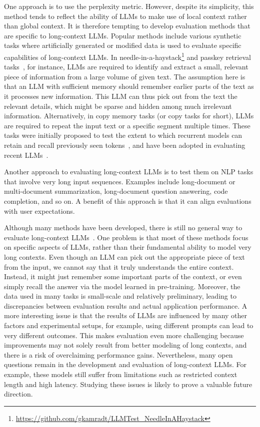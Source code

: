 One approach is to use the perplexity metric. However, despite its simplicity, this method tends to reflect the ability of LLMs to make use of local context rather than global context. It is therefore tempting to develop evaluation methods that are specific to long-context LLMs. Popular methods include various synthetic tasks where artificially generated or modified data is used to evaluate specific capabilities of long-context LLMs. In needle-in-a-haystack\footnote{\url{https://github.com/gkamradt/LLMTest_NeedleInAHaystack}} and passkey retrieval tasks~\cite{mohtashami-and-jaggi:2024random,chen-etal:2023extending}, for instance, LLMs are required to identify and extract a small, relevant piece of information from a large volume of given text. The assumption here is that an LLM with sufficient memory should remember earlier parts of the text as it processes new information. This LLM can thus pick out from the text the relevant details, which might be sparse and hidden among much irrelevant information. Alternatively, in copy memory tasks (or copy tasks for short), LLMs are required to repeat the input text or a specific segment multiple times. These tasks were initially proposed to test the extent to which recurrent models can retain and recall previously seen tokens~\cite{hochreiter-schmidhuber:1997long,arjovsky-etal:2016unitary}, and have been adopted in evaluating recent LLMs~\cite{bulatov-etal:2022recurrent,gu-and-dao:2023mamba}.

Another approach to evaluating long-context LLMs is to test them on NLP tasks that involve very long input sequences. Examples include long-document or multi-document summarization, long-document question answering, code completion, and so on. A benefit of this approach is that it can align evaluations with user expectations.

Although many methods have been developed, there is still no general way to evaluate long-context LLMs~\cite{liu-etal:2024forgetting}. One problem is that most of these methods focus on specific aspects of LLMs, rather than their fundamental ability to model very long contexts. Even though an LLM can pick out the appropriate piece of text from the input, we cannot say that it truly understands the entire context. Instead, it might just remember some important parts of the context, or even simply recall the answer via the model learned in pre-training. Moreover, the data used in many tasks is small-scale and relatively preliminary, leading to discrepancies between evaluation results and actual application performance. A more interesting issue is that the results of LLMs are influenced by many other factors and experimental setups, for example, using different prompts can lead to very different outcomes. This makes evaluation even more challenging because improvements may not solely result from better modeling of long contexts, and there is a risk of overclaiming performance gains. Nevertheless, many open questions remain in the development and evaluation of long-context LLMs. For example, these models still suffer from limitations such as restricted context length and high latency. Studying these issues is likely to prove a valuable future direction.

